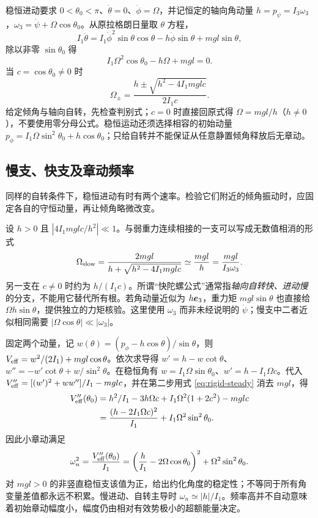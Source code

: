 稳恒进动要求 $0<\theta_0<\pi$、$\dot\theta=0$、$\dot\phi=\Omega$，并记恒定的轴向角动量 $h=p_\psi=I_3\omega_3$，$\omega_3=\dot\psi+\Omega\cos\theta_0$。从原拉格朗日量取 $\theta$ 方程，
\[
I_1\ddot\theta=I_1\dot\phi^2\sin\theta\cos\theta-h\dot\phi\sin\theta+mgl\sin\theta,
\]
除以非零 $\sin\theta_0$ 得
\begin{equation}
I_1\Omega^2\cos\theta_0-h\Omega+mgl=0.
\label{eq:rigid-steady}
\end{equation}
当 $c=\cos\theta_0\ne0$ 时
\[
\Omega_\pm=\frac{h\pm\sqrt{h^2-4I_1mgl c}}{2I_1c}.
\]
给定倾角与轴向自转，先检查判别式；$c=0$ 时直接回原式得 $\Omega=mgl/h$（$h\ne0$），不要使用零分母公式。稳恒运动还须选择相容的初始动量 $p_\phi=I_1\Omega\sin^2\theta_0+h\cos\theta_0$；只给自转并不能保证从任意静置倾角释放后无章动。

\subsection{慢支、快支及章动频率}
同样的自转条件下，稳恒进动有时有两个速率。检验它们附近的倾角振动时，应固定各自的守恒动量，再让倾角略微改变。

设 $h>0$ 且 $|4I_1mgl c/h^2|\ll1$。与弱重力连续相接的一支可以写成无数值相消的形式
\begin{equation}
\Omega_{\rm slow}=\frac{2mgl}{h+\sqrt{h^2-4I_1mgl c}}
\simeq\frac{mgl}{h}=\frac{mgl}{I_3\omega_3}.
\label{eq:fast-top-precession}
\end{equation}
另一支在 $c\ne0$ 时约为 $h/(I_1c)$。所谓“快陀螺公式”通常指\emph{轴向自转快、进动慢}的分支，不能用它替代所有根。若角动量近似为 $h\boldsymbol{e}_3$，重力矩 $mgl\sin\theta$ 也直接给 $\Omega h\sin\theta$，提供独立的力矩核验。这里使用 $\omega_3$ 而非未经说明的 $\dot\psi$；慢支中二者近似相同需要 $|\Omega\cos\theta|\ll|\omega_3|$。

固定两个动量，记 $w(\theta)=(p_\phi-h\cos\theta)/\sin\theta$，则 $V_{\rm eff}=w^2/(2I_1)+mgl\cos\theta$。依次求导得 $w'=h-w\cot\theta$、$w''=-w'\cot\theta+w/\sin^2\theta$。在稳恒角有 $w=I_1\Omega\sin\theta_0$、$w'=h-I_1\Omega c$。代入 $V_{\rm eff}''=[(w')^2+ww'']/I_1-mgl c$，并在第二步用式 \eqref{eq:rigid-steady} 消去 $mgl$，得
\begin{align*}
V_{\rm eff}''(\theta_0)
&=h^2/I_1-3h\Omega c+I_1\Omega^2(1+2c^2)-mgl c\\
&=\frac{(h-2I_1\Omega c)^2}{I_1}+I_1\Omega^2\sin^2\theta_0.
\end{align*}
因此小章动满足
\begin{equation}
\omega_n^2=\frac{V_{\rm eff}''(\theta_0)}{I_1}
=\left(\frac h{I_1}-2\Omega\cos\theta_0\right)^2
+\Omega^2\sin^2\theta_0.
\label{eq:nutation-frequency}
\end{equation}
对 $mgl>0$ 的非竖直稳恒支该值为正，给出约化角度的稳定性；不等同于所有角变量差值都永远不积累。慢进动、自转主导时 $\omega_n\simeq |h|/I_1$。频率高并不自动意味着初始章动幅度小，幅度仍由相对有效势极小的超额能量决定。

